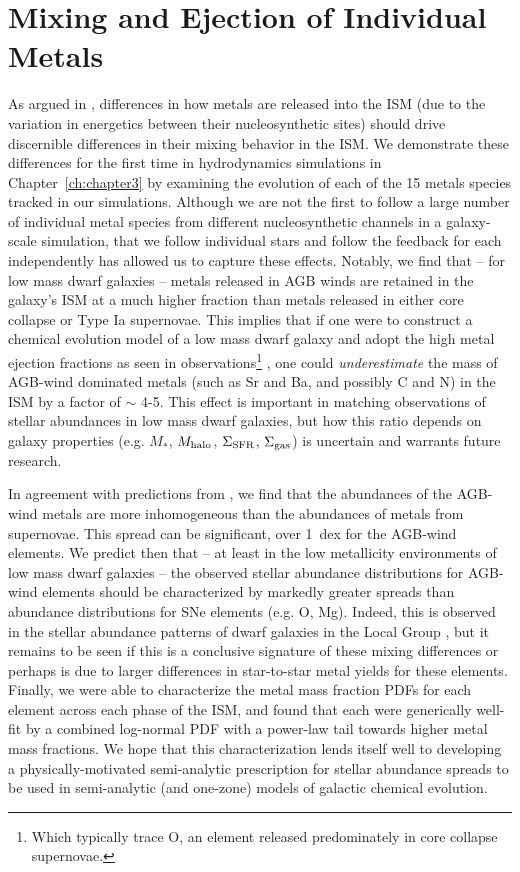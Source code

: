 \section{Mixing and Ejection of Individual Metals}
\label{conclusion:sec:ch3}

As argued in \cite{KrumholzTing2018}, differences in how metals are released into the ISM (due to the variation in energetics between their nucleosynthetic sites) should drive discernible differences in their mixing behavior in the ISM. We demonstrate these differences for the first time in hydrodynamics simulations in Chapter~\ref{ch:chapter3} by examining the evolution of each of the 15 metals species tracked in our simulations. Although we are not the first to follow a large number of individual metal species from different nucleosynthetic channels in a galaxy-scale simulation, that we follow individual stars and follow the feedback for each independently has allowed us to capture these effects. Notably, we find that -- for low mass dwarf galaxies -- metals released in AGB winds are retained in the galaxy's ISM at a much higher fraction than metals released in either core collapse or Type Ia supernovae. This implies that if one were to construct a chemical evolution model of a low mass dwarf galaxy and adopt the high metal ejection fractions as seen in observations\footnote{Which typically trace O, an element released predominately in core collapse supernovae.} \citep{Kirby2011-metals,McQuinn2015}, one could \textit{underestimate} the mass of AGB-wind dominated metals (such as Sr and Ba, and possibly C and N) in the ISM by a factor of $\sim$ 4-5. This effect is important in matching observations of stellar abundances in low mass dwarf galaxies, but how this ratio depends on galaxy properties (e.g. $M_*$, $M_{\rm halo}$, $\Sigma_{\rm SFR}$, $\Sigma_{\rm gas}$) is uncertain and warrants future research.

In agreement with predictions from \cite{KrumholzTing2018}, we find that the abundances of the AGB-wind metals are more inhomogeneous than the abundances of metals from supernovae. This spread can be significant, over 1~dex for the AGB-wind elements. We predict then that -- at least in the low metallicity environments of low mass dwarf galaxies -- the observed stellar abundance distributions for AGB-wind elements should be characterized by markedly greater spreads than abundance distributions for SNe elements (e.g. O, Mg). Indeed, this is observed in the stellar abundance patterns of dwarf galaxies in the Local Group \citep{Suda2017}, but it remains to be seen if this is a conclusive signature of these mixing differences or perhaps is due to larger differences in star-to-star metal yields for these elements. Finally, we were able to characterize the metal mass fraction PDFs for each element across each phase of the ISM, and found that each were generically well-fit by a combined log-normal PDF with a power-law tail towards higher metal mass fractions. We hope that this characterization lends itself well to developing a physically-motivated semi-analytic prescription for stellar abundance spreads to be used in semi-analytic (and one-zone) models of galactic chemical evolution.

